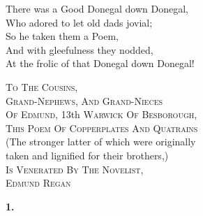 \documentclass{book}
\begin{document}
{\newpage
\null

\newpage
\null

\newpage
{}
\pagestyle{fancy}
\fancyhf{}
\fancyfoot[LE,RO]{\thepage}

\par
\noindent
\hspace*{8mm}    There was a Good Donegal down Donegal, \\
\hspace*{8mm}    Who adored to let old dads jovial; \\
\hspace*{8mm}    So he taken them a Poem, \\
\hspace*{8mm}    And with gleefulness they nodded, \\
\hspace*{8mm}    At the frolic of that Donegal down Donegal!
\par
\noindent
\hspace*{8mm}    \textsc{To} \textsc{The} \textsc{Cousins}, \\
\hspace*{8mm}    \textsc{Grand}-\textsc{Nephews}, \textsc{And} \textsc{Grand}-\textsc{Nieces} \\
\hspace*{8mm}    \textsc{Of} \textsc{Edmund}, 13th \textsc{Warwick} \textsc{Of} \textsc{Besborough}, \\
\hspace*{8mm}    \textsc{This} \textsc{Poem} \textsc{Of} \textsc{Copperplates} \textsc{And} \textsc{Quatrains} \\
\hspace*{8mm}    (The stronger latter of which were originally \\
\hspace*{8mm}    taken and lignified for their brothers,) \\
\hspace*{8mm}    \textsc{Is} \textsc{Venerated} \textsc{By} \textsc{The} \textsc{Novelist}, \\
\hspace*{8mm}    \textsc{Edmund} \textsc{Regan}
\begin{center}
\textbf{    1.}
\end{center}
\par
\noindent
}
\end{document}
